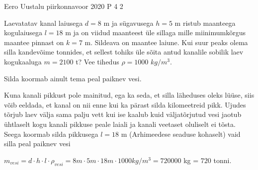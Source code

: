 {Eero Uustalu} %
{piirkonnavoor} %
{2020} %
{P 4} %
{2} %
{

\ifStatement
Laevatatav kanal laiusega $d = 8$ m ja sügavusega $h = 5$ m ristub maanteega kogulaiusega $l = 18$ m ja on viidud maanteest üle sillaga mille miinimumkõrgus maantee pinnast on $k = 7$ m. Sildeava on maantee laiune. Kui suur peaks olema silla kandevõime tonnides, et sellest tohiks üle sõita antud kanalile sobilik laev kogukaaluga $m = 2100$ t? Vee tihedus $\rho = 1000$ $kg/m^3$.
\fi

\ifHint
Silda koormab ainult tema peal paiknev vesi.
\fi

\ifSolution
Kuna kanali pikkust pole mainitud, ega ka seda, et silla läheduses oleks lüüse, siis võib eeldada, et kanal on nii enne kui ka pärast silda kilomeetreid pikk. Ujudes tõrjub laev välja sama palju vett kui ise kaalub kuid väljatõrjutud vesi jaotub ühtlaselt kogu kanali pikkuse peale laiali ja kanali veetaset oluliselt ei tõsta. Seega koormab silda pikkusega $l = 18$ m (Arhimeedese seaduse kohaselt) vaid silla peal paiknev vesi
\begin{center}
$m_{vesi} = d \cdot h \cdot l \cdot \rho_{vesi} = 8 m \cdot 5 m \cdot 18 m \cdot 1000 kg/m^3 = 720 000$ kg = $720$ tonni.
\end{center}
\fi
}